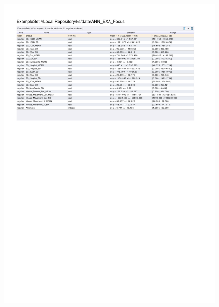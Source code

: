 \begin{figure}[htp]
  \centerline{\includegraphics[trim=0 530 0 60,clip,width=16.09cm]{results/ANN_EXA_Focus.pdf}} \caption{
} \label{ANN_K_Focus}
\end{figure}

